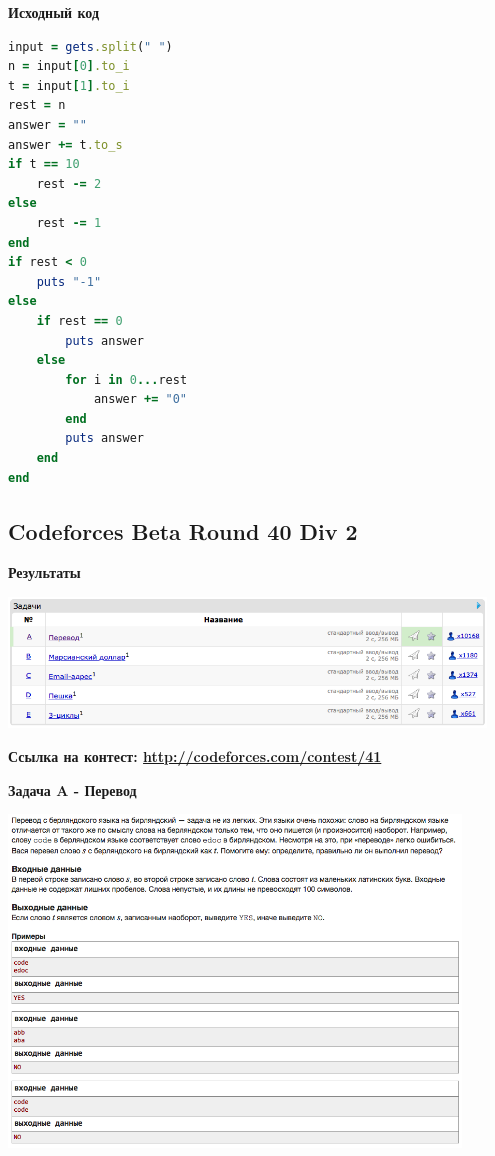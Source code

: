 \documentclass[a4paper,12pt]{article}
\begin{document}
\textbf{{\large Исходный код}} \\
\begin{lstlisting}[language=Ruby]
input = gets.split(" ")
n = input[0].to_i
t = input[1].to_i
rest = n
answer = ""
answer += t.to_s
if t == 10
	rest -= 2
else
	rest -= 1
end
if rest < 0
	puts "-1"
else
	if rest == 0
		puts answer
	else
		for i in 0...rest
			answer += "0"
		end
		puts answer
	end
end\end{lstlisting}




%
%

\newpage
\subsection{Codeforces Beta Round 40 Div 2}

\textbf{{\large Результаты}} \\
\begin{center}
\includegraphics[width=0.95\textwidth]{C_40/result.png}\\ [1cm]
\end{center}

\textbf{{\large Ссылка на контест: \url{http://codeforces.com/contest/41}}}

\newpage
\textbf{{\large Задача A - Перевод}}

\begin{center}
\includegraphics[width=0.9\textwidth]{C_40/A.png}\\ [1cm]
\end{center}
\end{document}
